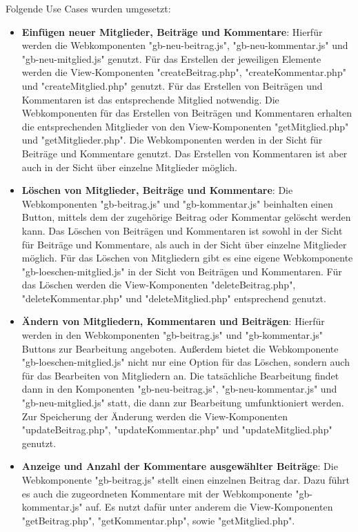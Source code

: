 Folgende Use Cases wurden umgesetzt:
\begin{itemize}
	\item \textbf{Einfügen neuer Mitglieder, Beiträge und Kommentare}: Hierfür werden die Webkomponenten "gb-neu-beitrag.js", "gb-neu-kommentar.js" und "gb-neu-mitglied.js" genutzt. Für das Erstellen der jeweiligen Elemente werden die View-Komponenten "createBeitrag.php", "createKommentar.php" und "createMitglied.php" genutzt. Für das Erstellen von Beiträgen und Kommentaren ist das entsprechende Mitglied notwendig. Die Webkomponenten für das Erstellen von Beiträgen und Kommentaren erhalten die entsprechenden Mitglieder von den View-Komponenten "getMitglied.php" und "getMitglieder.php". Die Webkomponenten werden in der Sicht für Beiträge und Kommentare genutzt. Das Erstellen von Kommentaren ist aber auch in der Sicht über einzelne Mitglieder möglich.
	\item \textbf{Löschen von Mitglieder, Beiträge und Kommentare}: Die Webkomponenten "gb-beitrag.js" und "gb-kommentar.js" beinhalten einen Button, mittels dem der zugehörige Beitrag oder Kommentar gelöscht werden kann. Das Löschen von Beiträgen und Kommentaren ist sowohl in der Sicht für Beiträge und Kommentare, als auch in der Sicht über einzelne Mitglieder möglich. Für das Löschen von Mitgliedern gibt es eine eigene Webkomponente "gb-loeschen-mitglied.js" in der Sicht von Beiträgen und Kommentaren. Für das Löschen werden die View-Komponenten "deleteBeitrag.php", "deleteKommentar.php" und "deleteMitglied.php" entsprechend genutzt.
	\item \textbf{Ändern von Mitgliedern, Kommentaren und Beiträgen}: Hierfür werden in den Webkomponenten "gb-beitrag.js" und "gb-kommentar.js" Buttons zur Bearbeitung angeboten. Außerdem bietet die Webkomponente "gb-loeschen-mitglied.js" nicht nur eine Option für das Löschen, sondern auch für das Bearbeiten von Mitgliedern an. Die tatsächliche Bearbeitung findet dann in den Komponenten "gb-neu-beitrag.js", "gb-neu-kommentar.js" und "gb-neu-mitglied.js" statt, die dann zur Bearbeitung umfunktioniert werden. Zur Speicherung der Änderung werden die View-Komponenten "updateBeitrag.php", "updateKommentar.php" und "updateMitglied.php" genutzt.
	\item \textbf{Anzeige und Anzahl der Kommentare ausgewählter Beiträge}: Die Webkomponente "gb-beitrag.js" stellt einen einzelnen Beitrag dar. Dazu führt es auch die zugeordneten Kommentare mit der Webkomponente "gb-kommentar.js" auf. Es nutzt dafür unter anderem die View-Komponenten "getBeitrag.php", "getKommentar.php", sowie "getMitglied.php".

\end{itemize}
